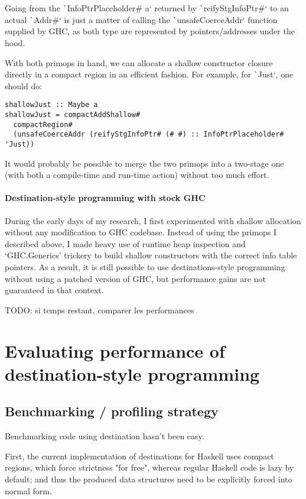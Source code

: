 \documentclass[english]{jflart}
\begin{document}
Going from the \texttt`InfoPtrPlaceholder# a` returned by \texttt`reifyStgInfoPtr#` to an actual \texttt`Addr#` is just a matter of calling the \texttt`unsafeCoerceAddr` function supplied by GHC, as both type are represented by pointers/addresses under the hood.

With both primops in hand, we can allocate a shallow constructor closure directly in a compact region in an efficient fashion. For example, for \texttt`Just`, one should do:
\begin{verbatim}
shallowJust :: Maybe a
shallowJust = compactAddShallow#
  compactRegion#
  (unsafeCoerceAddr (reifyStgInfoPtr# (# #) :: InfoPtrPlaceholder# 'Just))  
\end{verbatim}

It would probably be possible to merge the two primops into a two-stage one (with both a compile-time and run-time action) without too much effort.

\paragraph{Destination-style programming with stock GHC}

During the early days of my research, I first experimented with shallow allocation without any modification to GHC codebase. Instead of using the primops I described above, I made heavy use of runtime heap inspection and `GHC.Generics' trickery to build shallow constructors with the correct info table pointers. As a result, it is still possible to use destinations-style programming without using a patched version of GHC, but performance gains are not guaranteed in that context.

TODO: si temps restant, comparer les performances

\section{Evaluating performance of destination-style programming}

\subsection{Benchmarking / profiling strategy}

Benchmarking code using destination hasn't been easy.

First, the current implementation of destinations for Haskell uses compact regions, which force strictness "for free", whereas regular Haskell code is lazy by default; and thus the produced data structures need to be explicitly forced into normal form.
\end{document}

